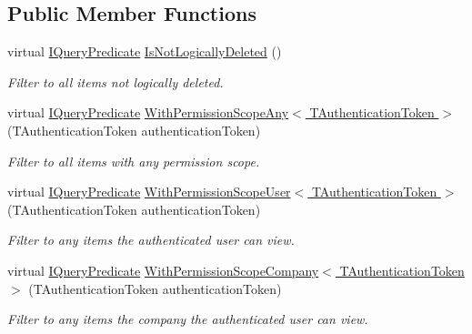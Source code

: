 \subsection*{Public Member Functions}
\begin{DoxyCompactItemize}
\item 
virtual \hyperlink{interfaceCqrs_1_1Repositories_1_1Queries_1_1IQueryPredicate}{I\+Query\+Predicate} \hyperlink{classCqrs_1_1Repositories_1_1Queries_1_1QueryStrategy_ab1841119fbbb58337d55b014a8b260b4_ab1841119fbbb58337d55b014a8b260b4}{Is\+Not\+Logically\+Deleted} ()
\begin{DoxyCompactList}\small\item\em Filter to all items not logically deleted. \end{DoxyCompactList}\item 
virtual \hyperlink{interfaceCqrs_1_1Repositories_1_1Queries_1_1IQueryPredicate}{I\+Query\+Predicate} \hyperlink{classCqrs_1_1Repositories_1_1Queries_1_1QueryStrategy_a7fda4380a88972201258bf695ccaf287_a7fda4380a88972201258bf695ccaf287}{With\+Permission\+Scope\+Any$<$ T\+Authentication\+Token $>$} (T\+Authentication\+Token authentication\+Token)
\begin{DoxyCompactList}\small\item\em Filter to all items with any permission scope. \end{DoxyCompactList}\item 
virtual \hyperlink{interfaceCqrs_1_1Repositories_1_1Queries_1_1IQueryPredicate}{I\+Query\+Predicate} \hyperlink{classCqrs_1_1Repositories_1_1Queries_1_1QueryStrategy_ad8b52782f5410a399949417b10820780_ad8b52782f5410a399949417b10820780}{With\+Permission\+Scope\+User$<$ T\+Authentication\+Token $>$} (T\+Authentication\+Token authentication\+Token)
\begin{DoxyCompactList}\small\item\em Filter to any items the authenticated user can view. \end{DoxyCompactList}\item 
virtual \hyperlink{interfaceCqrs_1_1Repositories_1_1Queries_1_1IQueryPredicate}{I\+Query\+Predicate} \hyperlink{classCqrs_1_1Repositories_1_1Queries_1_1QueryStrategy_a822a0901976ceadb3f096326860e3006_a822a0901976ceadb3f096326860e3006}{With\+Permission\+Scope\+Company$<$ T\+Authentication\+Token $>$} (T\+Authentication\+Token authentication\+Token)
\begin{DoxyCompactList}\small\item\em Filter to any items the company the authenticated user can view. \end{DoxyCompactList}\item 

\end{DoxyCompactItemize}
